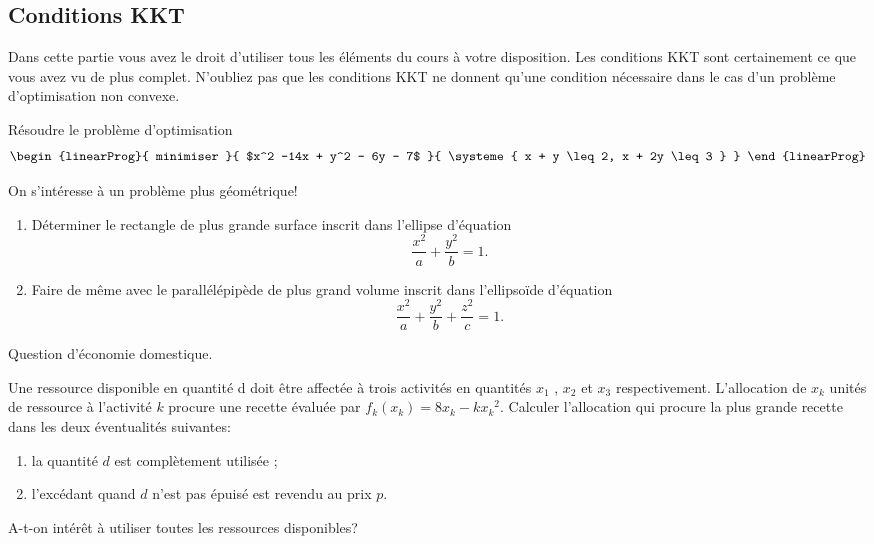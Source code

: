 \documentclass[11pt, a4paper]{article}
\begin{document}
\subsection{Conditions KKT}

Dans cette partie vous avez le droit d'utiliser tous les éléments du
cours à votre disposition. Les conditions KKT sont certainement ce que
vous avez vu de plus complet. N'oubliez pas que les conditions KKT ne
donnent qu'une condition nécessaire dans le cas d'un problème
d'optimisation non convexe.

\begin{question}
  Résoudre le problème d'optimisation
  \[
  \begin{linearProg}{
      minimiser
    }{
      $x^2 -14x + y^2 - 6y - 7$
    }{
      \systeme{
        x + y \leq 2,
        x + 2y \leq 3
      }  
    }
  \end{linearProg}
  \]
\end{question}

\noindent On s'intéresse à un problème plus géométrique!

\begin{question}
  \begin{enumerate}
  \item 
    Déterminer le rectangle de plus grande surface inscrit dans
    l'ellipse d'équation 
    \[ 
    \frac{x^2}{a} + \frac{y^2}{b} = 1.
    \]
  \item 
    Faire de même avec le parallélépipède de plus grand volume inscrit
    dans l'ellipsoïde d'équation 
    \[
    \frac{x^2}{a} + \frac{y^2}{b} + \frac{z^2}{c} = 1.
    \]
  \end{enumerate}
\end{question}

\noindent Question d'économie domestique.

\begin{question}
  Une ressource disponible en quantité d doit être affectée à trois
  activités en quantités $x_1$ , $x_2$ et $x_3$
  respectivement. L’allocation de $x_k$ unités de ressource à
  l’activité $k$ procure une recette évaluée par
  $f_k(x_k) = 8x_k - k{x_k}^2$. Calculer l'allocation qui procure la
  plus grande recette dans les deux éventualités suivantes:
  \begin{enumerate}
  \item la quantité $d$ est complètement utilisée ;
  \item l'excédant quand $d$ n'est pas épuisé est revendu au prix $p$.
  \end{enumerate}
  A-t-on intérêt à utiliser toutes les ressources disponibles?
\end{question}
\end{document}
